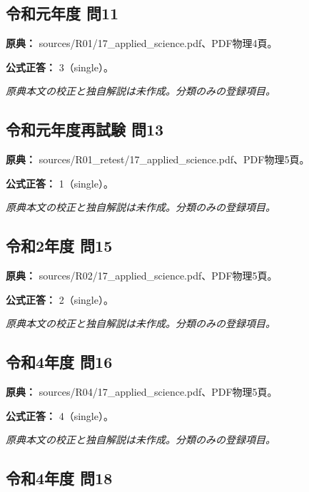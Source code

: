 \subsection{令和元年度 問11}
\label{q:r01-reg-applied-11}

\noindent\textbf{原典：} sources/R01/17\_applied\_science.pdf、PDF物理4頁。

\textbf{公式正答：} 3（single）。

\par\textit{原典本文の校正と独自解説は未作成。分類のみの登録項目。}

\subsection{令和元年度再試験 問13}
\label{q:r01-ret-applied-13}

\noindent\textbf{原典：} sources/R01\_retest/17\_applied\_science.pdf、PDF物理5頁。

\textbf{公式正答：} 1（single）。

\par\textit{原典本文の校正と独自解説は未作成。分類のみの登録項目。}

\subsection{令和2年度 問15}
\label{q:r02-reg-applied-15}

\noindent\textbf{原典：} sources/R02/17\_applied\_science.pdf、PDF物理5頁。

\textbf{公式正答：} 2（single）。

\par\textit{原典本文の校正と独自解説は未作成。分類のみの登録項目。}

\subsection{令和4年度 問16}
\label{q:r04-reg-applied-16}

\noindent\textbf{原典：} sources/R04/17\_applied\_science.pdf、PDF物理5頁。

\textbf{公式正答：} 4（single）。

\par\textit{原典本文の校正と独自解説は未作成。分類のみの登録項目。}

\subsection{令和4年度 問18}
\label{q:r04-reg-applied-18}

